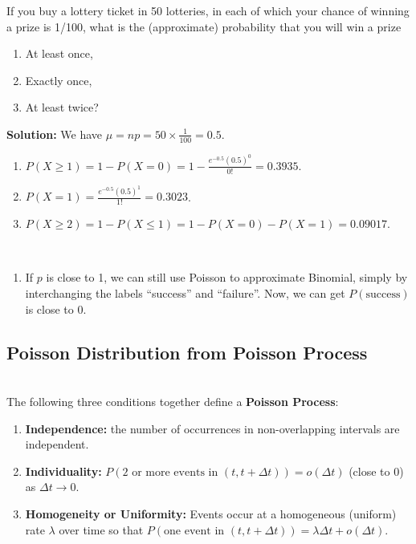 \begin{example}
    If you buy a lottery ticket in 50 lotteries, in each of which your chance of winning a prize is
    1/100, what is the (approximate) probability that you will win a prize
    \begin{enumerate}[label=(\alph*)]
        \item At least once,
        \item Exactly once,
        \item At least twice?
    \end{enumerate}

    \textbf{Solution:} We have $\mu = np = 50 \times \frac{1}{100} = 0.5$.
    \begin{enumerate}[label=(\alph*)]
        \item $P(X \geq 1) = 1 - P(X = 0) = 1 - \frac{e^{-0.5}(0.5)^0}{0!} = 0.3935$.
        \item $P(X = 1) = \frac{e^{-0.5}(0.5)^1}{1!} = 0.3023$.
        \item $P(X \geq 2) = 1 - P(X \leq 1) = 1 - P(X = 0) - P(X = 1) = 0.09017$. \\
    \end{enumerate}
\end{example}


\begin{note}
    \phantom{}\
    \begin{enumerate}
        \item If $p$ is close to 1, we can still use Poisson to approximate Binomial, simply by interchanging the labels ``success'' and ``failure''. Now, we can get $P(\text{success})$ is close to 0.
    \end{enumerate}
\end{note}

\pagebreak

\subsection{Poisson Distribution from Poisson Process}

\begin{definition}
    \phantom{}  \\
    The following three conditions together define a \textbf{Poisson Process}:
    \begin{enumerate}
        \item \textbf{Independence:} the number of occurrences in non-overlapping intervals are independent.
        \item \textbf{Individuality:} $P(\text{2 or more events in $(t, t+\Delta t)$}) = o(\Delta t)$ (close to 0) as $\Delta t \to 0$.
        \item \textbf{Homogeneity or Uniformity:} Events occur at a homogeneous (uniform) rate $\lambda$ over time so that
        $P(\text{one event in $(t, t+\Delta t)$}) = \lambda \Delta t + o(\Delta t)$.
    \end{enumerate}
\end{definition}

